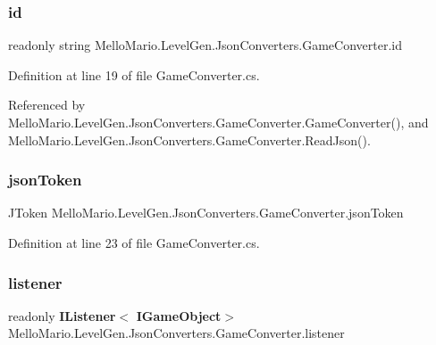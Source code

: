 \subsubsection{id}
{\footnotesize\ttfamily readonly string Mello\+Mario.\+Level\+Gen.\+Json\+Converters.\+Game\+Converter.\+id\hspace{0.3cm}{\ttfamily [private]}}



Definition at line 19 of file Game\+Converter.\+cs.



Referenced by Mello\+Mario.\+Level\+Gen.\+Json\+Converters.\+Game\+Converter.\+Game\+Converter(), and Mello\+Mario.\+Level\+Gen.\+Json\+Converters.\+Game\+Converter.\+Read\+Json().

\mbox{\label{classMelloMario_1_1LevelGen_1_1JsonConverters_1_1GameConverter_a0ad89d72188a8752ba498441aa2de9ce}} 
\subsubsection{json\+Token}
{\footnotesize\ttfamily J\+Token Mello\+Mario.\+Level\+Gen.\+Json\+Converters.\+Game\+Converter.\+json\+Token\hspace{0.3cm}{\ttfamily [private]}}



Definition at line 23 of file Game\+Converter.\+cs.

\mbox{\label{classMelloMario_1_1LevelGen_1_1JsonConverters_1_1GameConverter_a4efe2a8e352ca6995d0ad3966c2a0d15}} 
\subsubsection{listener}
{\footnotesize\ttfamily readonly \textbf{ I\+Listener}$<$\textbf{ I\+Game\+Object}$>$ Mello\+Mario.\+Level\+Gen.\+Json\+Converters.\+Game\+Converter.\+listener\hspace{0.3cm}{\ttfamily [private]}}



